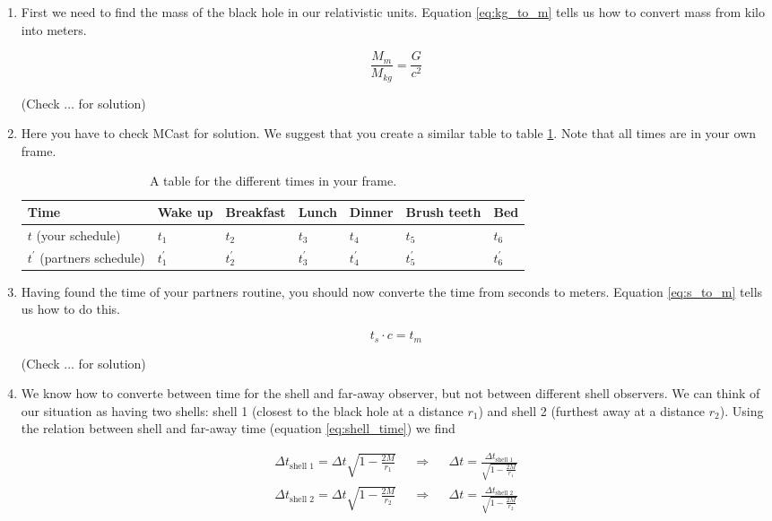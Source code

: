 \documentclass[a4paper,10pt,english]{article}
\begin{document}
\begin{enumerate}

\item First we need to find the mass of the black hole in our relativistic units. Equation \ref{eq:kg_to_m} tells us how to convert mass from kilo into meters. 

\[\frac{M_{m}}{M_{kg}}=\frac{G}{c^{2}}\] 

(Check $\ldots$ for solution)

\item Here you have to check MCast for solution. We suggest that you create a similar table to table \ref{table:1}. Note that all times are in your own frame.

  \begin{table}[H]
  \begin{center}
    \begin{tabular}{| l | l | l | l | l | l | l | }
   	\hline
	Time & Wake up & Breakfast & Lunch & Dinner & Brush teeth & Bed \\ \hline
	 $t$ (your schedule) & $t_{1}$ & $t_{2}$ & $t_{3}$ & $t_{4}$ & $t_{5}$ & $t_{6}$ \\ \hline
	 $t^{\prime}$ (partners schedule) & $t^{\prime}_{1}$ & $t^{\prime}_{2}$ & $t^{\prime}_{3}$ & $t^{\prime}_{4}$ & $t^{\prime}_{5}$ & $t^{\prime}_{6}$\\ \hline
	\end{tabular}
    \caption{A table for the different times in your frame.}
    \label{table:1}
  \end{center}
\end{table}


\item Having found the time of your partners routine, you should now converte the time from seconds to meters. Equation \ref{eq:s_to_m} tells us how to do this. 

\[t_{s}\cdot c=t_{m}\] 

(Check $\ldots$ for solution)

\item We know how to converte between time for the shell and far-away observer, but not between different shell observers. We can think of our situation as having two shells: shell 1 (closest to the black hole at a distance $r_{1}$) and shell 2 (furthest away at a distance $r_{2}$). Using the relation between shell and far-away time (equation \ref{eq:shell_time}) we find

\begin{align*}
\Delta t_{\text{shell 1}}=\Delta t\sqrt{1-\frac{2M}{r_{1}}} &&\Rightarrow&& \Delta t=\frac{\Delta t_{\text{shell 1}}}{\sqrt{1-\frac{2M}{r_{1}}}}\\
\Delta t_{\text{shell 2}}=\Delta t\sqrt{1-\frac{2M}{r_{2}}} &&\Rightarrow&& \Delta t=\frac{\Delta t_{\text{shell 2}}}{\sqrt{1-\frac{2M}{r_{2}}}}
\end{align*}


\end{enumerate}
\end{document}
